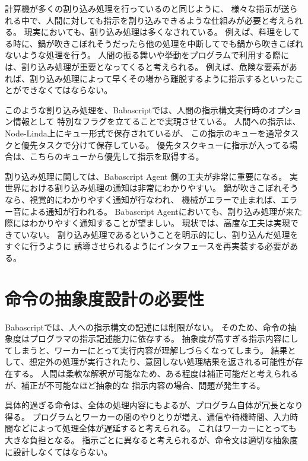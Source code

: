 計算機が多くの割り込み処理を行っているのと同じように、
様々な指示が送られる中で、人間に対しても指示を割り込みできるような仕組みが必要と考えられる。
現実においても、割り込み処理は多くなされている。
例えば、料理をしてる時に、鍋が吹きこぼれそうだったら他の処理を中断してでも鍋から吹きこぼれないような処理を行う。
人間の振る舞いや挙動をプログラムで利用する際には、割り込み処理が重要となってくると考えられる。
例えば、危険な要素があれば、割り込み処理によって早くその場から離脱するように指示するといったことができなくてはならない。

このような割り込み処理を、Babascriptでは、人間の指示構文実行時のオプション情報として
特別なフラグを立てることで実現させている。
人間への指示は、Node-Linda上にキュー形式で保存されているが、
この指示のキューを通常タスクと優先タスクで分けて保存している。
優先タスクキューに指示が入ってる場合は、こちらのキューから優先して指示を取得する。

割り込み処理に関しては、Babascript Agent 側の工夫が非常に重要になる。
実世界における割り込み処理の通知は非常にわかりやすい。
鍋が吹きこぼれそうなら、視覚的にわかりやすく通知が行なわれ、
機械がエラーで止まれば、エラー音による通知が行われる。 Babascript
Agentにおいても、割り込み処理が来た際にはわかりやすく通知することが望ましい。
現状では、高度な工夫は実現できていない。
割り込み処理であるということを明示的にし、割り込んだ処理をすぐに行うように
誘導させられるようにインタフェースを再実装する必要がある。

\section{命令の抽象度設計の必要性}\label{ux547dux4ee4ux306eux62bdux8c61ux5ea6ux8a2dux8a08ux306eux5fc5ux8981ux6027}

Babascriptでは、人への指示構文の記述には制限がない。
そのため、命令の抽象度はプログラマの指示記述能力に依存する。
抽象度が高すぎる指示内容にしてしまうと、ワーカーにとって実行内容が理解しづらくなってしまう。
結果として、想定外の処理が実行されたり、意図しない処理結果を返される可能性が存在する。
人間は柔軟な解釈が可能なため、ある程度は補正可能だと考えられるが、補正が不可能なほど抽象的な
指示内容の場合、問題が発生する。

具体的過ぎる命令は、全体の処理内容にもよるが、プログラム自体が冗長となり得る。
プログラムとワーカーの間のやりとりが増え、通信や待機時間、入力時間などによって処理全体が遅延すると考えられる。
これはワーカーにとっても大きな負担となる。
指示ごとに異なると考えられるが、命令文は適切な抽象度に設計しなくてはならない。

